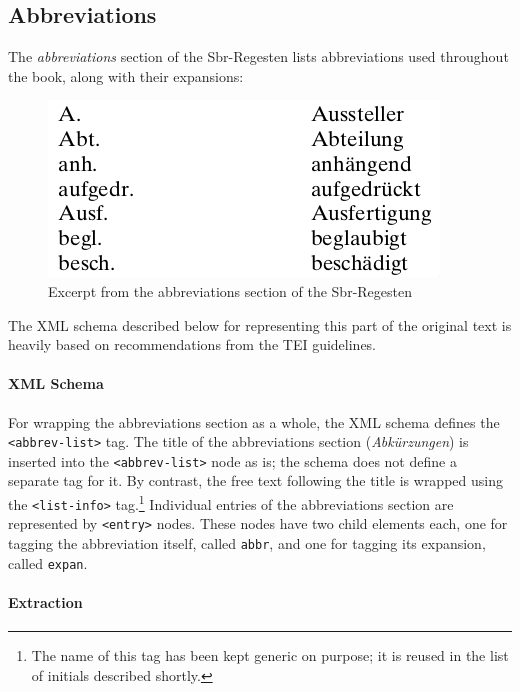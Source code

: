 \subsection{Abbreviations}
\label{sec:abbrevs}

The \emph{abbreviations} section of the Sbr-Regesten lists
abbreviations used throughout the book, along with their expansions:

\begin{figure}[h]
  \centering
  \includegraphics[scale=0.4]{img/abbrevs}
  \caption{Excerpt from the abbreviations section of the Sbr-Regesten}
  \label{fig:abbrevs}
\end{figure}

The XML schema described below for representing this part of the
original text is heavily based on recommendations from the TEI
guidelines.

\paragraph{XML Schema}

For wrapping the abbreviations section as a whole, the XML schema
defines the \texttt{<abbrev-list>} tag. The title of the abbreviations
section (\emph{Abkürzungen}) is inserted into the
\texttt{<abbrev-list>} node as is; the schema does not define a
separate tag for it. By contrast, the free text following the title is
wrapped using the \texttt{<list-info>} tag.\footnote{The name of this
  tag has been kept generic on purpose; it is reused in the list of
  initials described shortly.} Individual entries of the abbreviations
section are represented by \texttt{<entry>} nodes. These nodes have
two child elements each, one for tagging the abbreviation itself,
called \texttt{abbr}, and one for tagging its expansion, called
\texttt{expan}.

\paragraph{Extraction}

